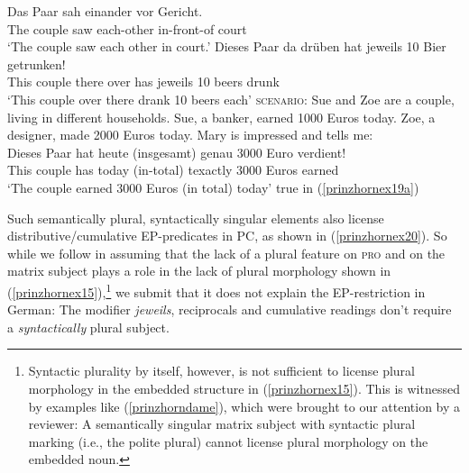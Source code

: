 \documentclass[output=paper,colorlinks,citecolor=brown,
]{langscibook}
\begin{document}
\ea \label{prinzhornex18} 
\ea 
\gll Das Paar sah einander vor Gericht.\\
  The couple saw each-other in-front-of  court \\
\glt `The couple saw each other in court.' \label{prinzhornex18a}
\ex   \gll Dieses Paar da drüben hat jeweils 10 Bier getrunken! \\
  This couple there over has jeweils 10 beers drunk\\
\glt `This couple over there drank 10 beers each'  \label{prinzhornex18b}
\ex  \textsc{scenario:} Sue and Zoe are a couple, living in different households. Sue, a banker, earned 1000 Euros today. Zoe, a designer, made 2000 Euros today. Mary is impressed and tells me: \label{prinzhornex19a}\\
\gll Dieses Paar hat heute (insgesamt) genau 3000 Euro verdient!\\
This couple has today (in-total) texactly 3000 Euros earned \\
\glt `The couple earned 3000 Euros (in total) today' \label{prinzhornex19b}\phantom{.}\hfill {true} in (\ref{prinzhornex19a})
\z\z

Such semantically plural, syntactically singular elements also license distributive\slash cumulative EP-predicates in PC, as shown in (\ref{prinzhornex20}). So while we follow \citet{Landau:2000} in assuming that the lack of a plural feature on \textsc{pro} and  on the matrix subject plays a role in the lack of plural morphology shown in (\ref{prinzhornex15}),\footnote{Syntactic plurality by itself, however, is not sufficient to license plural morphology in the embedded structure in (\ref{prinzhornex15}). This is witnessed by examples like (\ref{prinzhorndame}), which were brought to our attention by a reviewer: A  semantically singular matrix subject with syntactic plural marking (i.e., the polite plural) cannot license plural morphology on the embedded noun.


\z

} we submit that it does not explain the EP-restriction in German: The modifier {\it jeweils}, reciprocals and cumulative readings don't require a \textit{syntactically} plural subject.
\end{document}
